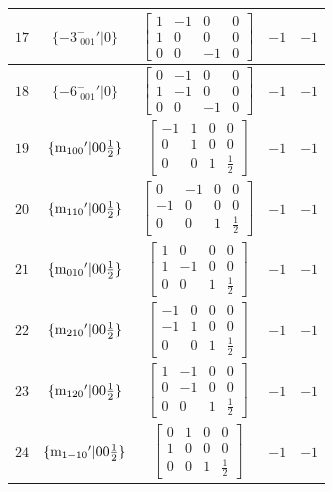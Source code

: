 \documentclass[fleqn,8pt]{jsarticle}
\begin{document}
\begin{longtable}{ccccc}
$ 17 $ & $ \{-3^{-}_{\,\,001}{}'|0\} $ & $ \begin{bmatrix} 1 & -1 & 0 & 0 \\ 1 & 0 & 0 & 0 \\ 0 & 0 & -1 & 0 \end{bmatrix} $ & $ -1 $ & $ -1 $ \\ \hline
$ 18 $ & $ \{-6^{-}_{\,\,001}{}'|0\} $ & $ \begin{bmatrix} 0 & -1 & 0 & 0 \\ 1 & -1 & 0 & 0 \\ 0 & 0 & -1 & 0 \end{bmatrix} $ & $ -1 $ & $ -1 $ \\ \hline
$ 19 $ & $ \{{\rm m}_{100}{}'|0 0 \frac{1}{2}\} $ & $ \begin{bmatrix} -1 & 1 & 0 & 0 \\ 0 & 1 & 0 & 0 \\ 0 & 0 & 1 & \frac{1}{2} \end{bmatrix} $ & $ -1 $ & $ -1 $ \\ \hline
$ 20 $ & $ \{{\rm m}_{110}{}'|0 0 \frac{1}{2}\} $ & $ \begin{bmatrix} 0 & -1 & 0 & 0 \\ -1 & 0 & 0 & 0 \\ 0 & 0 & 1 & \frac{1}{2} \end{bmatrix} $ & $ -1 $ & $ -1 $ \\ \hline
$ 21 $ & $ \{{\rm m}_{010}{}'|0 0 \frac{1}{2}\} $ & $ \begin{bmatrix} 1 & 0 & 0 & 0 \\ 1 & -1 & 0 & 0 \\ 0 & 0 & 1 & \frac{1}{2} \end{bmatrix} $ & $ -1 $ & $ -1 $ \\ \hline
$ 22 $ & $ \{{\rm m}_{210}{}'|0 0 \frac{1}{2}\} $ & $ \begin{bmatrix} -1 & 0 & 0 & 0 \\ -1 & 1 & 0 & 0 \\ 0 & 0 & 1 & \frac{1}{2} \end{bmatrix} $ & $ -1 $ & $ -1 $ \\ \hline
$ 23 $ & $ \{{\rm m}_{120}{}'|0 0 \frac{1}{2}\} $ & $ \begin{bmatrix} 1 & -1 & 0 & 0 \\ 0 & -1 & 0 & 0 \\ 0 & 0 & 1 & \frac{1}{2} \end{bmatrix} $ & $ -1 $ & $ -1 $ \\ \hline
$ 24 $ & $ \{{\rm m}_{1-10}{}'|0 0 \frac{1}{2}\} $ & $ \begin{bmatrix} 0 & 1 & 0 & 0 \\ 1 & 0 & 0 & 0 \\ 0 & 0 & 1 & \frac{1}{2} \end{bmatrix} $ & $ -1 $ & $ -1 $ \\
\end{longtable}
\end{document}
